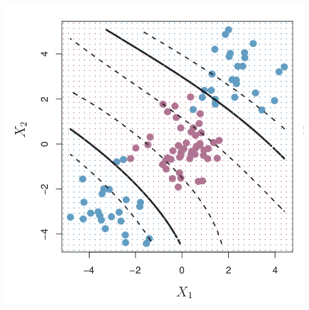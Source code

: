\documentclass[mathserif, aspectratio=169]{beamer}
\begin{document}
\begin{frame}
\begin{columns}[c]
			\includegraphics[width=\textwidth]{SVM_example}
	\end{columns}
\end{frame}
\end{document}
